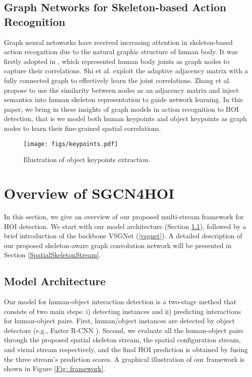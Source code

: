 \documentclass[a4paper, 10pt, conference]{IEEEtran}
\begin{document}
\subsection{Graph Networks for Skeleton-based Action Recognition}
Graph neural netoworks have received increasing attention in skeleton-based action recognition due to the natural graphic structure of human body. It was firstly adopted in \cite{STGCN}, which represented human body joints as graph nodes to capture their correlations. Shi et al. \cite{AGCN} exploit the adaptive adjacency matrix with a fully connected graph to effectively learn the joint correlations. Zhang et al. \cite{SGN} propose to use the similarity between nodes as an adjacency matrix and inject semantics into human skeleton representation to guide network learning. In this paper, we bring in these insights of graph models in action recognition to HOI detection, that is we model both human keypoints and object keypoints as graph nodes to learn their fine-grained spatial correlations.

\begin{figure*}[htbp]
\centering
	\texttt{[image: figs/keypoints.pdf]}
	\caption{\footnotesize{Illustration of object keypoints extraction.}}
	\label{Fig: pointExtraction}
\end{figure*}

\section{Overview of SGCN4HOI}
\label{Overview}
In this section, we give an overview of our proposed multi-stream framework for HOI detection. We start with our model architecture (Section \ref{architecture}), followed by a brief introduction of the backbone VSGNet (\ref{vsgnet}). A detailed description of our proposed skeleton-aware graph convolution network will be presented in Section \ref{SpatialSkeletonStream}. 



\subsection{Model Architecture}
\label{architecture}
Our model for human-object interaction detection is a two-stage method that consists of two main steps: i) detecting instances and ii) predicting interactions for human-object pairs. First, human/object instances are detected by object detectors (e.g., Faster R-CNN \cite{Faster-R-CNN}). Second, we evaluate all the human-object pairs through the proposed spatial skeleton stream, the spatial configuration stream, and visual stream respectively, and the final HOI prediction is obtained by fusing the three stream's prediction scores. A graphical illustration of our framework is shown in Figure \ref{Fig: framework}.
\end{document}
